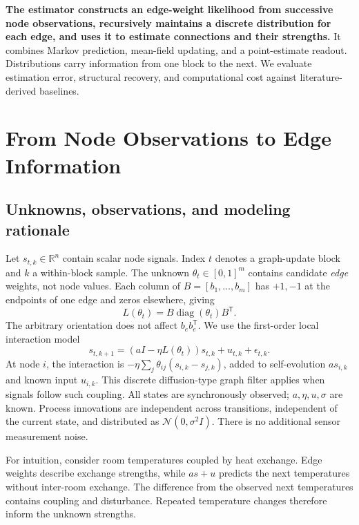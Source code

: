 \documentclass[journal]{IEEEtran}
\newcommand{\T}{\mathsf T}
\begin{document}
\textbf{The estimator constructs an edge-weight likelihood from successive node observations, recursively maintains a discrete distribution for each edge, and uses it to estimate connections and their strengths.} It combines Markov prediction, mean-field updating, and a point-estimate readout. Distributions carry information from one block to the next. We evaluate estimation error, structural recovery, and computational cost against literature-derived baselines.

\section{From Node Observations to Edge Information}
\subsection{Unknowns, observations, and modeling rationale}
Let $s_{t,k}\in\mathbb R^n$ contain scalar node signals. Index $t$ denotes a graph-update block and $k$ a within-block sample. The unknown $\theta_t\in[0,1]^m$ contains candidate \emph{edge} weights, not node values. Each column of $B=[b_1,\ldots,b_m]$ has $+1,-1$ at the endpoints of one edge and zeros elsewhere, giving
\begin{equation}
L(\theta_t)=B\operatorname{diag}(\theta_t)B^\T.\label{eq:lap}
\end{equation}
The arbitrary orientation does not affect $b_eb_e^\T$.
We use the first-order local interaction model
\begin{equation}
s_{t,k+1}=(aI-\eta L(\theta_t))s_{t,k}+u_{t,k}+\epsilon_{t,k}.\label{eq:dynamic}
\end{equation}
At node $i$, the interaction is $-\eta\sum_j\theta_{ij}(s_{i,k}-s_{j,k})$, added to self-evolution $as_{i,k}$ and known input $u_{i,k}$. This discrete diffusion-type graph filter \cite{shuman} applies when signals follow such coupling. All states are synchronously observed; $a,\eta,u,\sigma$ are known. Process innovations are independent across transitions, independent of the current state, and distributed as $\mathcal N(0,\sigma^2I)$. There is no additional sensor measurement noise.

For intuition, consider room temperatures coupled by heat exchange. Edge weights describe exchange strengths, while $as+u$ predicts the next temperatures without inter-room exchange. The difference from the observed next temperatures contains coupling and disturbance. Repeated temperature changes therefore inform the unknown strengths. 
\end{document}
